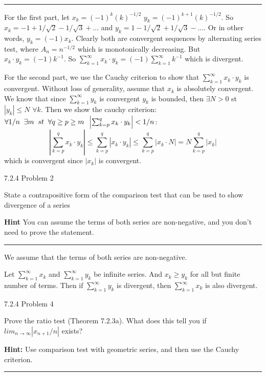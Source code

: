 \documentclass[11pt]{article}
\begin{document}
\hrule

For the first part, let $x_k = (-1)^k (k)^{-1/2}$ $y_k = (-1)^{k+1} (k)^{-1/2}$.
So $x_k = -1 + 1/\sqrt{2} - 1/\sqrt{3} + ...$ and $y_k = 1 - 1/\sqrt{2} + 1/\sqrt{3} - ...$.
Or in other words, $y_k = (-1) x_k$. Clearly both are convergent sequences by alternating series test,
where $A_n = n^{-1/2}$ which is monotonically decreasing. But $x_k \cdot y_k = (-1) k^{-1}$. So
$\sum_{k = 1} ^\infty x_k \cdot y_k = (-1) \sum_{k = 1} ^\infty k^{-1}$ which is divergent.


For the second part, we use the Cauchy criterion to show that $\sum_{k = 1} ^\infty x_k \cdot y_k$ is convergent.
Without loss of generality, assume that $x_k$ is absolutely convergent. We know that since $\sum_{k = 1} ^\infty y_k$ is convergent $y_k$ is bounded,
then $\exists N > 0$ st $|y_k| \leq N$ $\forall k$. Then we show the cauchy criterion: $\forall 1/n \sp \exists m \sp st \sp \forall q \geq p \geq m \sp \left| \sum_{k = p} ^q x_k \cdot y_k \right| < 1/n$: 
$$ \left| \sum_{k = p} ^q x_k \cdot y_k \right| \leq  \sum_{k = p} ^q \left| x_k \cdot y_k \right| \leq \sum_{k = p} ^q \left| x_k \cdot N \right| = N \sum_{k = p} ^q \left| x_k \right|$$
which is convergent since $|x_k|$ is convergent.






 7.2.4 Problem 2

State a contrapositive form of the comparison test that can be used to show divergence of a series

\textbf{Hint} You can assume the terms of both series are non-negative, and you don't need to prove the statement.


\hrule

We assume that the terms of both series are non-negative. 

Let $\sum_{k=1} ^\infty x_k$ and $\sum_{k=1} ^\infty y_k$ be infinite series. And $x_k \geq y_k$ for all but finite number of terms.
Then if $\sum_{k=1} ^\infty y_k$ is divergent, then $\sum_{k=1} ^\infty x_k$ is also divergent.





 7.2.4 Problem 4

Prove the ratio test (Theorem 7.2.3a). What does this tell you if $lim_{n \to \infty} |x_{n+1} / n|$ exists?

\textbf{Hint: } Use comparison test with geometric series, and then use the Cauchy criterion.

\hrule
\end{document}
